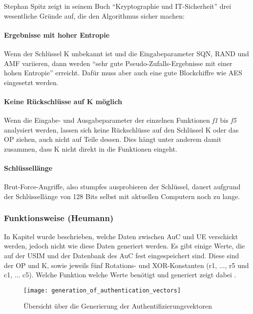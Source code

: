  Stephan Spitz zeigt in seinem Buch ``Kryptographie und IT-Sicherheit'' \cite{spitz11} drei
 wesentliche Gründe auf, die den Algorithmus sicher machen:
 
 \paragraph{Ergebnisse mit hoher Entropie}
 Wenn der Schlüssel K unbekannt ist und die Eingabeparameter \ac{SQN}, RAND
 und \ac{AMF} variieren, dann werden ``sehr gute Pseudo-Zufalls-Ergebnisse mit einer hohen
 Entropie'' \cite{spitz11} erreicht. Dafür muss aber auch eine gute Blockchiffre wie AES
 eingesetzt werden.
 
 \paragraph{Keine Rückschlüsse auf K möglich}
 Wenn die Eingabe- und Ausgabeparameter der einzelnen Funktionen \emph{f1} bis \emph{f5}
 analysiert werden, lassen sich keine Rückschlüsse auf den Schlüssel K oder das \acf{OP}
 ziehen, auch nicht auf Teile dessen. Dies hängt unter anderem damit zusammen, dass K nicht
 direkt in die Funktionen eingeht.
 
 \paragraph{Schlüssellänge}
 Brut-Force-Angriffe, also stumpfes ausprobieren der Schlüssel, dauert aufgrund der
 Schlüssellänge von 128 Bits selbst mit aktuellen Computern noch zu lange.
 

 \subsubsection{Funktionsweise (Heumann)}
 \label{milenage-funktion}
 In Kapitel  wurde beschrieben, welche Daten zwischen
 \ac{AuC} und \ac{UE} verschickt werden, jedoch nicht wie diese Daten generiert werden. Es
 gibt einige Werte, die auf der \ac{USIM} und der Datenbank des \ac{AuC} fest eingespeichert
 sind. Diese sind der \ac{OP} und K, sowie jeweils fünf Rotations- und XOR-Konstanten
 (r1, ..., r5 und c1, ... c5). Welche Funktion welche Werte benötigt und generiert zeigt dabei .
 
 \begin{figure}[htp]
  \begin{center}
   \texttt{[image: generation\_of\_authentication\_vectors]}
  \end{center}
  \caption[Übersicht über die Generierung der Authentifizierungsvektoren]{Übersicht über die Generierung der Authentifizierungsvektoren \cite{3gpp.33.102}}
  \label{fig:funktionsubersicht}
 \end{figure}
 
